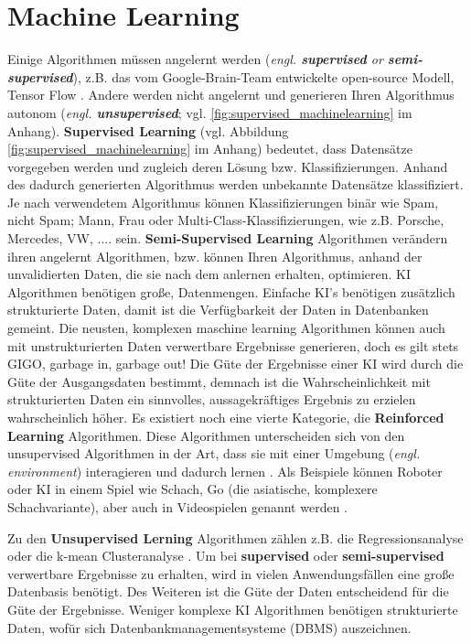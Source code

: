 \newpage



\section*{Machine Learning}

Einige Algorithmen müssen angelernt werden (\textit{engl. \textbf{supervised} or \textbf{semi-supervised}}), z.B. das vom Google-Brain-Team entwickelte open-source Modell, Tensor Flow \cite{tensorflow_framework}. Andere werden nicht angelernt und generieren Ihren Algorithmus autonom (\textit{engl. \textbf{unsupervised}}; vgl. \ref{fig:supervised_machinelearning} im Anhang). \textbf{Supervised Learning}  (vgl. Abbildung \ref{fig:supervised_machinelearning} im Anhang) bedeutet, dass Datensätze vorgegeben werden und zugleich deren Lösung bzw. Klassifizierungen. Anhand des dadurch generierten Algorithmus werden unbekannte Datensätze klassifiziert. Je nach verwendetem Algorithmus können Klassifizierungen binär wie Spam, nicht Spam; Mann, Frau oder Multi-Class-Klassifizierungen, wie z.B. Porsche, Mercedes, VW, .... sein. \textbf{Semi-Supervised Learning} Algorithmen verändern ihren angelernt Algorithmen, bzw. können Ihren Algorithmus, anhand der unvalidierten Daten, die sie nach dem anlernen erhalten, optimieren. KI Algorithmen benötigen große, Datenmengen. Einfache KI's benötigen zusätzlich strukturierte Daten, damit ist die Verfügbarkeit der Daten in Datenbanken gemeint. Die neusten, komplexen \cite{unstrukturierte_daten_ki} maschine learning Algorithmen können auch mit unstrukturierten Daten verwertbare Ergebnisse generieren, doch es gilt stets GIGO, \glqq garbage in, garbage out!\grqq{} Die Güte der Ergebnisse einer KI wird durch die Güte der Ausgangsdaten bestimmt, demnach ist die Wahrscheinlichkeit mit strukturierten Daten ein sinnvolles, aussagekräftiges Ergebnis zu erzielen wahrscheinlich höher.
Es existiert noch eine vierte Kategorie, die \textbf{Reinforced Learning} Algorithmen. Diese Algorithmen unterscheiden sich von den unsupervised Algorithmen in der Art, dass sie mit einer Umgebung (\textit{engl. environment}) interagieren und dadurch lernen \cite[S. 15 f.]{machine_learning_kompakt}. Als Beispiele können Roboter oder KI in einem Spiel wie Schach, Go (die asiatische, komplexere Schachvariante), aber auch in Videospielen genannt werden \cite{reinforced_learning_go}.

Zu den \textbf{Unsupervised Lerning} Algorithmen zählen z.B. die Regressionsanalyse oder die k-mean Clusteranalyse \cite[S. 114]{machine_learning_kompakt}. Um bei \textbf{supervised} oder \textbf{semi-supervised} verwertbare Ergebnisse zu erhalten, wird in vielen Anwendungsfällen eine \glqq große\grqq{} Datenbasis benötigt. Des Weiteren ist die Güte der Daten entscheidend für die Güte der Ergebnisse. Weniger komplexe KI Algorithmen benötigen strukturierte Daten, wofür sich Datenbankmanagementsysteme (DBMS) auszeichnen.\\

